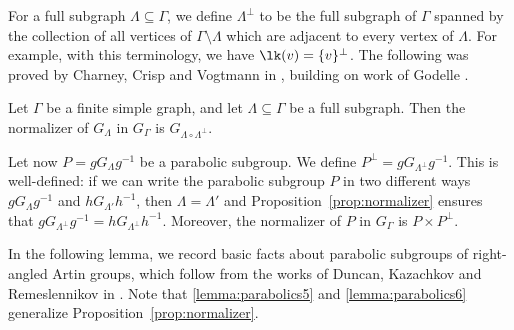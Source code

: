 For a full subgraph $\Lambda\subseteq \Gamma$, we define $\Lambda^{\perp}$ to be the full subgraph of $\Gamma$ spanned by the collection of all vertices of $\Gamma\setminus \Lambda$ which are adjacent to every vertex of $\Lambda$. For example, with this terminology, we have $\lk(v)=\{v\}^\perp$. The following was proved by Charney, Crisp and Vogtmann in \cite[Prop.\,2.2]{charney2007automorphisms}, building on work of Godelle \cite{God}.

\begin{prop}\label{prop:normalizer}
Let $\Gamma$ be a finite simple graph, and let $\Lambda\subseteq\Gamma$ be a full subgraph. Then the normalizer of $G_{\Lambda}$ in $G_{\Gamma}$ is $G_{\Lambda\circ \Lambda^{\perp}}$.
\end{prop}

Let now $P=gG_{\Lambda}g^{-1}$ be a parabolic subgroup. We define $P^\perp=gG_{\Lambda^\perp}g^{-1}$. This is well-defined: if we can write the parabolic subgroup $P$ in two different ways $gG_{\Lambda}g^{-1}$ and $hG_{\Lambda'}h^{-1}$, then $\Lambda=\Lambda'$ and Proposition~\ref{prop:normalizer} ensures that $gG_{\Lambda^\perp}g^{-1}=hG_{\Lambda^\perp}h^{-1}$. Moreover, the normalizer of $P$ in $G_{\Gamma}$ is $P\times P^\perp$.

In the following lemma, we record basic facts about parabolic subgroups of right-angled Artin groups, which follow from the works of Duncan, Kazachkov and Remeslennikov in \cite[\S 2.2]{duncan2007parabolic}. Note that \eqref{lemma:parabolics5} and \eqref{lemma:parabolics6} generalize Proposition~\ref{prop:normalizer}.

